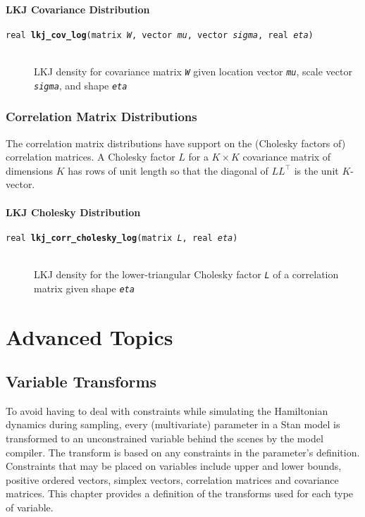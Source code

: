 \documentclass[10pt]{report}
\newcommand{\Stan}{Stan\xspace}
\newcommand{\fitem}[4]{\item[{\tt #1 {\bfseries #2}(#3)}]\mbox{ } \\[4pt] #4}
\newcommand{\farg}[1]{{\tt\slshape #1}}
\begin{document}
\subsection{LKJ Covariance Distribution}

\begin{description}
%
\fitem{real}{lkj\_cov\_log}{matrix \farg{W}, vector \farg{mu}, vector
\farg{sigma}, real \farg{eta}}{LKJ density for covariance matrix
\farg{W} given location vector \farg{mu}, scale vector \farg{sigma},
and shape \farg{eta}}
%
\end{description}



\section{Correlation Matrix Distributions}

The correlation matrix distributions have support on the (Cholesky
factors of) correlation matrices.  A Cholesky factor $L$ for a $K
\times K$ covariance matrix of dimensions $K$ has rows of unit length
so that the diagonal of $L L^{\top}$ is the unit $K$-vector.

\subsection{LKJ Cholesky Distribution}

\begin{description}
%
\fitem{real}{lkj\_corr\_cholesky\_log}{matrix \farg{L}, real
  \farg{eta}}{LKJ density for the lower-triangular Cholesky factor
  \farg{L} of a correlation matrix given shape \farg{eta}}
%
\end{description}






\part{Advanced Topics}


\chapter{Variable Transforms}\label{variable-transforms.chapter}

To avoid having to deal with constraints while simulating the
Hamiltonian dynamics during sampling, every (multivariate) parameter
in a \Stan model is transformed to an unconstrained variable behind
the scenes by the model compiler.  The transform is based on any
constraints in the parameter's definition.  Constraints that may be
placed on variables include upper and lower bounds, positive ordered
vectors, simplex vectors, correlation matrices and covariance
matrices.  This chapter provides a definition of the transforms used
for each type of variable.
\end{document}
